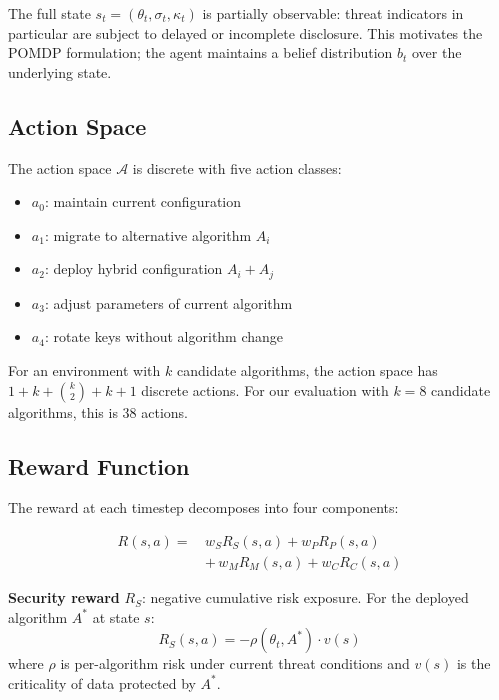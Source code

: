 \documentclass[sigconf,nonacm]{acmart}
\begin{document}
The full state $s_t = (\theta_t, \sigma_t, \kappa_t)$ is partially
observable: threat indicators in particular are subject to delayed
or incomplete disclosure. This motivates the POMDP formulation; the
agent maintains a belief distribution $b_t$ over the underlying state.

\subsection{Action Space}

The action space $\mathcal{A}$ is discrete with five action classes:

\begin{itemize}
  \item $a_0$: maintain current configuration
  \item $a_1$: migrate to alternative algorithm $A_i$
  \item $a_2$: deploy hybrid configuration $A_i + A_j$
  \item $a_3$: adjust parameters of current algorithm
  \item $a_4$: rotate keys without algorithm change
\end{itemize}

For an environment with $k$ candidate algorithms, the action space
has $1 + k + \binom{k}{2} + k + 1$ discrete actions. For our
evaluation with $k=8$ candidate algorithms, this is 38 actions.

\subsection{Reward Function}

The reward at each timestep decomposes into four components:

\begin{equation}
\begin{aligned}
  R(s,a) =\,&w_S R_S(s,a) + w_P R_P(s,a) \\
  &+\, w_M R_M(s,a) + w_C R_C(s,a)
\end{aligned}
\end{equation}

\textbf{Security reward} $R_S$: negative cumulative risk exposure.
For the deployed algorithm $A^*$ at state $s$:
\begin{equation}
  R_S(s,a) = -\rho(\theta_t, A^*) \cdot v(s)
\end{equation}
where $\rho$ is per-algorithm risk under current threat conditions
and $v(s)$ is the criticality of data protected by $A^*$.
\end{document}
